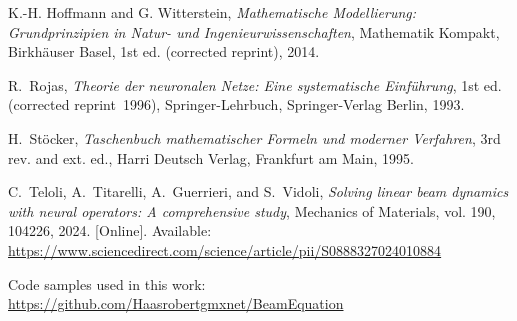 \documentclass[a4paper,11pt]{article}
\begin{document}
\newpage
\begin{thebibliography}{9}

K.-H. Hoffmann and G. Witterstein, 
\emph{Mathematische Modellierung: Grundprinzipien in Natur- und Ingenieurwissenschaften}, 
Mathematik Kompakt, Birkhäuser Basel, 1st ed. (corrected reprint), 2014.

R.~Rojas,
\emph{Theorie der neuronalen Netze: Eine systematische Einführung},
1st ed. (corrected reprint 1996), Springer-Lehrbuch, Springer-Verlag Berlin, 1993.

H.~Stöcker, 
\emph{Taschenbuch mathematischer Formeln und moderner Verfahren}, 
3rd rev. and ext. ed., Harri Deutsch Verlag, Frankfurt am Main, 1995.

C.~Teloli, A.~Titarelli, A.~Guerrieri, and S.~Vidoli, 
\emph{Solving linear beam dynamics with neural operators: A comprehensive study}, 
Mechanics of Materials, vol. 190, 104226, 2024. [Online]. Available: \url{https://www.sciencedirect.com/science/article/pii/S0888327024010884}

Code samples used in this work: \url{https://github.com/Haasrobertgmxnet/BeamEquation}

\end{thebibliography}


\newpage

\end{document}
